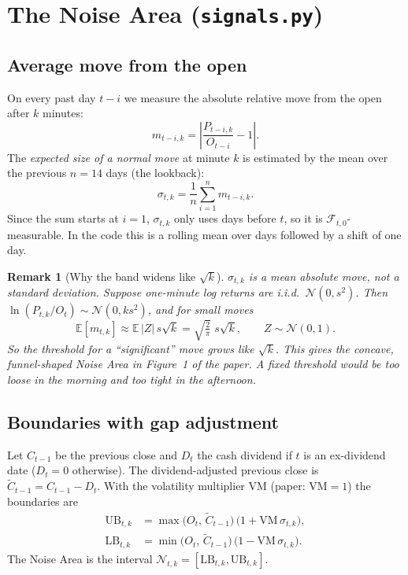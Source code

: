 \documentclass[11pt,a4paper]{article}
\newtheorem*{remark}{Remark}
\newcommand{\UB}{\mathrm{UB}}
\newcommand{\LB}{\mathrm{LB}}
\newcommand{\E}{\mathbb{E}}
\newcommand{\1}{\mathbf{1}}
\begin{document}
\section{The Noise Area (\texttt{signals.py})}

\subsection{Average move from the open}
On every past day $t-i$ we measure the absolute relative move from the open after $k$ minutes:
\begin{equation}
  m_{t-i,k} = \left| \frac{P_{t-i,k}}{O_{t-i}} - 1 \right| .
\end{equation}
The \emph{expected size of a normal move} at minute $k$ is estimated by the mean over the
previous $n = 14$ days (the lookback):
\begin{equation}\label{eq:sigma}
  \sigma_{t,k} = \frac{1}{n}\sum_{i=1}^{n} m_{t-i,k} .
\end{equation}
Since the sum starts at $i=1$, $\sigma_{t,k}$ only uses days before $t$, so it is $\mathcal F_{t,0}$-measurable.
In the code this is a rolling mean over days followed by a shift of one day.

\begin{remark}[Why the band widens like $\sqrt{k}$]
$\sigma_{t,k}$ is a mean \emph{absolute} move, not a standard deviation. Suppose one-minute log returns
are i.i.d.\ $\mathcal N(0,s^2)$. Then $\ln(P_{t,k}/O_t) \sim \mathcal N(0, k s^2)$, and for small moves
\[
  \E[m_{t,k}] \approx \E\,|Z|\, s\sqrt{k} = \sqrt{\tfrac{2}{\pi}}\; s\sqrt{k}, \qquad Z\sim\mathcal N(0,1).
\]
So the threshold for a ``significant'' move grows like $\sqrt{k}$. This gives the concave, funnel-shaped
Noise Area in Figure~1 of the paper. A fixed threshold would be too loose in the morning and too tight
in the afternoon.
\end{remark}

\subsection{Boundaries with gap adjustment}
Let $C_{t-1}$ be the previous close and $D_t$ the cash dividend if $t$ is an ex-dividend date
($D_t = 0$ otherwise). The dividend-adjusted previous close is $\tilde C_{t-1} = C_{t-1} - D_t$.
With the volatility multiplier $\mathrm{VM}$ (paper: $\mathrm{VM}=1$) the boundaries are
\begin{align}
  \UB_{t,k} &= \max\!\big(O_t,\, \tilde C_{t-1}\big)\,\big(1 + \mathrm{VM}\,\sigma_{t,k}\big), \label{eq:ub}\\
  \LB_{t,k} &= \min\!\big(O_t,\, \tilde C_{t-1}\big)\,\big(1 - \mathrm{VM}\,\sigma_{t,k}\big). \label{eq:lb}
\end{align}
The Noise Area is the interval $\mathcal N_{t,k} = [\LB_{t,k}, \UB_{t,k}]$.
\end{document}
